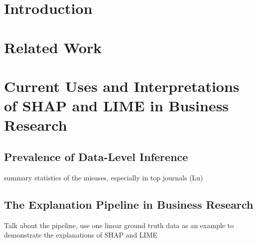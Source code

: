 \documentclass[11pt]{article}
\makeatletter
\newcommand\syllogism[3][]{%
  \begin{center}
  \def\tmp{#1}%
  \ifx\tmp\empty\else(#1)\quad\fi
  \begin{tabular}{@{}l@{}}
    #2\\\hline#3\quad$\therefore$
  \end{tabular}
  \end{center}
}
\makeatother
\begin{document}







\section{Introduction}
\section{Related Work}
\section{Current Uses and Interpretations of SHAP and LIME in Business Research}
\subsection{Prevalence of Data-Level Inference}
summary statistics of the misuses, especially in top journals (Lu)
\subsection{The Explanation Pipeline in Business Research}
Talk about the pipeline, use one linear ground truth data as an example to demonstrate the explanations of SHAP and LIME
\end{document}
